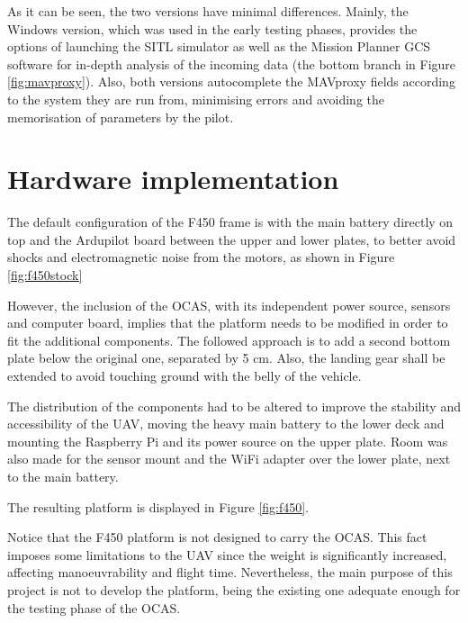 

As it can be seen, the two versions have minimal differences.
Mainly, the Windows version, which was used in the early testing phases, provides the options of launching the SITL simulator as well as the Mission Planner GCS software for in-depth analysis of the incoming data (the bottom branch in Figure \ref{fig:mavproxy}).
Also, both versions autocomplete the MAVproxy fields according to the system they are run from, minimising errors and avoiding the memorisation of parameters by the pilot.


\section{Hardware implementation}

The default configuration of the F450 frame is with the main battery directly on top and the Ardupilot board between the upper and lower plates, to better avoid shocks and electromagnetic noise from the motors, as shown in Figure \ref{fig:f450stock}



However, the inclusion of the OCAS, with its independent power source, sensors and computer board, implies that the platform needs to be modified in order to fit the additional components.
The followed approach is to add a second bottom plate below the original one, separated by 5 cm.
Also, the landing gear shall be extended to avoid touching ground with the belly of the vehicle.

The distribution of the components had to be altered to improve the stability and accessibility of the UAV, moving the heavy main battery to the lower deck and mounting the Raspberry Pi and its power source on the upper plate.
Room was also made for the sensor mount and the WiFi adapter over the lower plate, next to the main battery.

The resulting platform is displayed in Figure \ref{fig:f450}.



Notice that the F450 platform is not designed to carry the OCAS.
This fact imposes some limitations to the UAV since the weight is significantly increased, affecting manoeuvrability and flight time.
Nevertheless, the main purpose of this project is not to develop the platform, being the existing one adequate enough for the testing phase of the OCAS.
